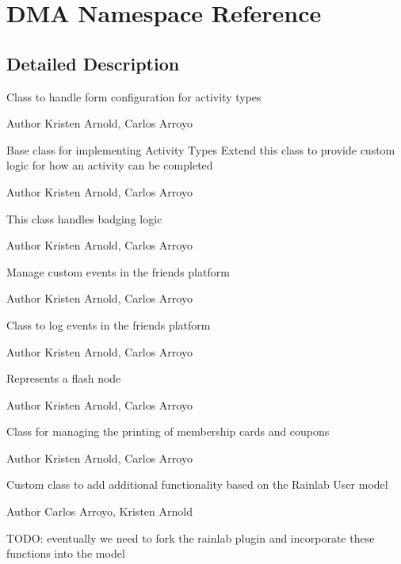 \hypertarget{namespaceDMA}{}\section{D\+M\+A Namespace Reference}
\label{namespaceDMA}


\subsection{Detailed Description}
Class to handle form configuration for activity types

\begin{DoxyAuthor}{Author}
Kristen Arnold, Carlos Arroyo
\end{DoxyAuthor}
Base class for implementing Activity Types Extend this class to provide custom logic for how an activity can be completed

\begin{DoxyAuthor}{Author}
Kristen Arnold, Carlos Arroyo
\end{DoxyAuthor}
This class handles badging logic

\begin{DoxyAuthor}{Author}
Kristen Arnold, Carlos Arroyo
\end{DoxyAuthor}
Manage custom events in the friends platform

\begin{DoxyAuthor}{Author}
Kristen Arnold, Carlos Arroyo
\end{DoxyAuthor}
Class to log events in the friends platform

\begin{DoxyAuthor}{Author}
Kristen Arnold, Carlos Arroyo
\end{DoxyAuthor}
Represents a flash node

\begin{DoxyAuthor}{Author}
Kristen Arnold, Carlos Arroyo
\end{DoxyAuthor}
Class for managing the printing of membership cards and coupons  \begin{DoxyAuthor}{Author}
Kristen Arnold, Carlos Arroyo
\end{DoxyAuthor}
Custom class to add additional functionality based on the Rainlab User model

\begin{DoxyAuthor}{Author}
Carlos Arroyo, Kristen Arnold
\end{DoxyAuthor}
T\+O\+D\+O\+: eventually we need to fork the rainlab plugin and incorporate these functions into the model

